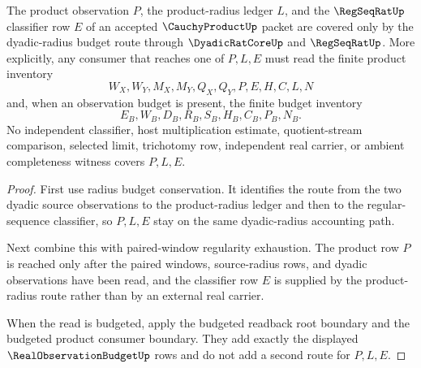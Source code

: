 \begin{theorem}
\label{thm:cauchy-product-root-budget-classifier-coverage}
The product observation $P$, the product-radius ledger $L$, and the $\RegSeqRatUp$ classifier row $E$ of an accepted $\CauchyProductUp$ packet are covered only by the dyadic-radius budget route through $\DyadicRatCoreUp$ and $\RegSeqRatUp$. More explicitly, any consumer that reaches one of $P,L,E$ must read the finite product inventory
$$
W_X,W_Y,M_X,M_Y,Q_X,Q_Y,P,E,H,C,L,N
$$
and, when an observation budget is present, the finite budget inventory
$$
E_B,W_B,D_B,R_B,S_B,H_B,C_B,P_B,N_B.
$$
No independent classifier, host multiplication estimate, quotient-stream comparison, selected limit, trichotomy row, independent real carrier, or ambient completeness witness covers $P,L,E$.
\end{theorem}
\begin{proof}
First use radius budget conservation. It identifies the route from the two dyadic source observations to the product-radius ledger and then to the regular-sequence classifier, so $P,L,E$ stay on the same dyadic-radius accounting path.

Next combine this with paired-window regularity exhaustion. The product row $P$ is reached only after the paired windows, source-radius rows, and dyadic observations have been read, and the classifier row $E$ is supplied by the product-radius route rather than by an external real carrier.

When the read is budgeted, apply the budgeted readback root boundary and the budgeted product consumer boundary. They add exactly the displayed $\RealObservationBudgetUp$ rows and do not add a second route for $P,L,E$.
\end{proof}

